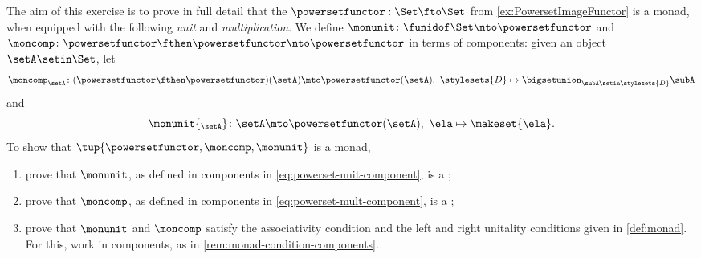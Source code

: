 \begin{gradedexercise}
    \label{ex:PowersetMonad}
    The aim of this exercise is to prove in full detail that the   $\powersetfunctor : \Set \fto \Set$ from \cref{ex:PowersetImageFunctor} is a monad, when equipped with the following \emph{unit} and \emph{multiplication}.
    We define $\monunit \colon \funidof\Set  \nto \powersetfunctor$ and $\moncomp \colon \powersetfunctor \fthen \powersetfunctor \nto \powersetfunctor$ in terms of components: given an object $\setA \setin \Set$, let
    \begin{equation}
        \label{eq:powerset-mult-component}
        \moncomp_{\setA} \colon (\powersetfunctor \fthen \powersetfunctor)(\setA) \mto \powersetfunctor(\setA), \ \stylesets{D} \mapsto \bigsetunion_{\subA \setin \stylesets{D}} \subA
    \end{equation}
    and
    \begin{equation}
        \label{eq:powerset-unit-component}
        \monunit{_\setA} \colon \setA \mto \powersetfunctor(\setA), \ \ela \mapsto \makeset{ \ela }.
    \end{equation}
    To show that $\tup{\powersetfunctor, \moncomp, \monunit}$ is a monad,
    \begin{enumerate}
        \item prove that $\monunit$, as defined in components in \cref{eq:powerset-unit-component}, is a ;
        \item prove that $\moncomp$, as defined in components in \cref{eq:powerset-mult-component}, is a ;
        \item prove that $\monunit$ and $\moncomp$ satisfy the associativity condition and the left and right unitality conditions given in \cref{def:monad}.
              For this, work in components, as in \cref{rem:monad-condition-components}.
    \end{enumerate}
\end{gradedexercise}


